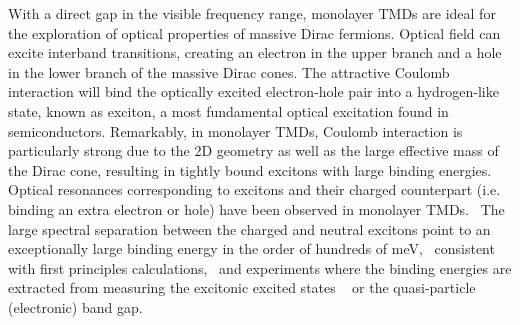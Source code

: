 \documentclass[prb,twocolumn,amsmath,amssymb,superscriptaddress,showpacs]{revtex4}
\begin{document}
With a direct gap in the visible frequency range, monolayer TMDs are ideal for the exploration of optical properties of massive Dirac fermions.
Optical field can excite interband transitions, creating an electron in the upper branch and a hole in the lower branch of the massive Dirac cones.
The attractive Coulomb interaction will bind the optically excited electron-hole pair into a hydrogen-like state, known as exciton, a most fundamental optical excitation found in semiconductors. Remarkably, in monolayer TMDs, Coulomb interaction is particularly strong due to the 2D geometry as well as the large effective mass of the Dirac cone, resulting in tightly bound excitons with large binding energies.  Optical resonances corresponding to excitons and their charged counterpart (i.e. binding an extra electron or hole) have been observed in monolayer TMDs.~\cite{Valley Coherence nnano2013, Electrical Control excitons ncomm2013, Mak Trions nmater2013}
The large spectral separation between the charged and neutral excitons point to an exceptionally large binding energy in the order of hundreds of meV,~\cite{Valley Coherence nnano2013, Electrical Control excitons ncomm2013, Mak Trions nmater2013} consistent with first principles calculations,~\cite{J. Feng nphoton2012, S. Louie MoS2 specturm calculation PRL2013,  Quaisi band calculation 2012, Excitonic effects calculation 2012, Binding energy from first principles 2012, Quasiparticle optical properties strained calculation 2013}
and experiments where the binding energies are extracted from measuring the excitonic excited states
~\cite{Heinz binding energy PRL2014, Jie Shan binding energy PRL2014, X Zhang S Louie TPA  2014, XD Cui TPA 2014, Urbaszek TPA and SHG PRL2015}
or the quasi-particle (electronic) band gap.~\cite{Shih MoS2 2.15eV, Berkeley bandgap renormalization nmat2014, S. Louie MoS2 specturm calculation PRL2013, Heinz binding energy PRL2014, Jie Shan binding energy PRL2014}
\end{document}

